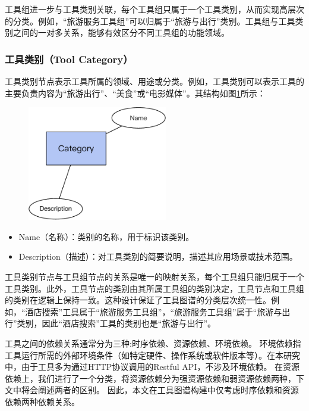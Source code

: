 工具组进一步与工具类别关联，每个工具组只属于一个工具类别，从而实现高层次的分类。例如，“旅游服务工具组”可以归属于“旅游与出行”类别。工具组与工具类别之间的一对多关系，能够有效区分不同工具组的功能领域。

\subsubsection{工具类别（Tool Category）}
工具类别节点表示工具所属的领域、用途或分类。例如，工具类别可以表示工具的主要负责内容为“旅游出行”、“美食”或“电影媒体”。其结构如图\ref{fig:ch3-kg-category}所示：

\begin{figure}[H]
    \vspace{1em}
    \centering
    \setlength{\abovecaptionskip}{10pt} %
    \includegraphics[height=5cm]{../assets/图谱格式-category.pdf}
    \label{fig:ch3-kg-category}
  \end{figure}

\begin{itemize}
    \item Name（名称）：类别的名称，用于标识该类别。
    \item Description（描述）：对工具类别的简要说明，描述其应用场景或技术范围。
\end{itemize}

工具类别节点与工具组节点的关系是唯一的映射关系，每个工具组只能归属于一个工具类别。此外，工具节点的类别由其所属工具组的类别决定，工具节点和工具组的类别在逻辑上保持一致。这种设计保证了工具图谱的分类层次统一性。例如，“酒店搜索”工具属于“旅游服务工具组”，“旅游服务工具组”属于“旅游与出行”类别，因此“酒店搜索”工具的类别也是“旅游与出行”。

工具之间的依赖关系通常分为三种\cite{shen2023taskbench}:时序依赖、资源依赖、环境依赖。
环境依赖指工具运行所需的外部环境条件（如特定硬件、操作系统或软件版本等）。在本研究中，由于工具多为通过HTTP协议调用的Restful API，不涉及环境依赖。
在资源依赖上，我们进行了一个分类，将资源依赖分为强资源依赖和弱资源依赖两种，下文中将会阐述两者的区别。
因此，本文在工具图谱构建中仅考虑时序依赖和资源依赖两种依赖关系。

